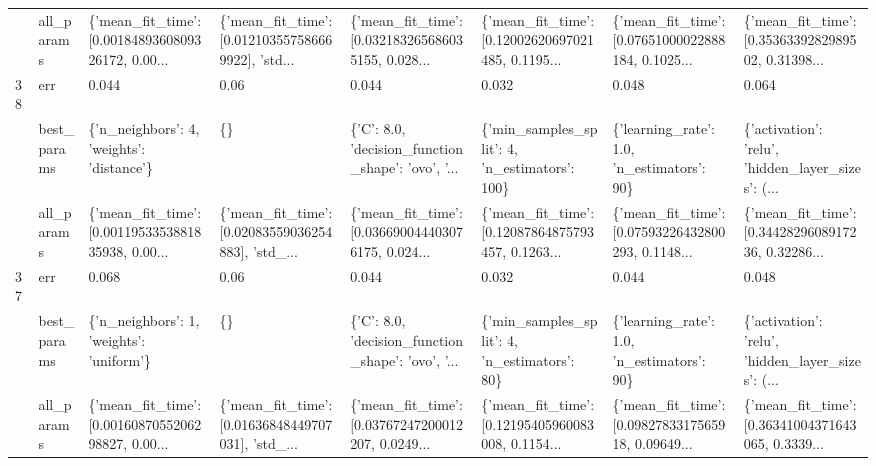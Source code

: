 \begin{tabular}{llllllll}
   & all\_params &  \{'mean\_fit\_time': [0.0018489360809326172, 0.00... &  \{'mean\_fit\_time': [0.012103557586669922], 'std... &  \{'mean\_fit\_time': [0.032183265686035155, 0.028... &  \{'mean\_fit\_time': [0.12002620697021485, 0.1195... &  \{'mean\_fit\_time': [0.07651000022888184, 0.1025... &  \{'mean\_fit\_time': [0.3536339282989502, 0.31398... \\
38 & err &                                              0.044 &                                               0.06 &                                              0.044 &                                              0.032 &                                              0.048 &                                              0.064 \\
   & best\_params &          \{'n\_neighbors': 4, 'weights': 'distance'\} &                                                 \{\} &  \{'C': 8.0, 'decision\_function\_shape': 'ovo', '... &      \{'min\_samples\_split': 4, 'n\_estimators': 100\} &         \{'learning\_rate': 1.0, 'n\_estimators': 90\} &  \{'activation': 'relu', 'hidden\_layer\_sizes': (... \\
   & all\_params &  \{'mean\_fit\_time': [0.0011953353881835938, 0.00... &  \{'mean\_fit\_time': [0.02083559036254883], 'std\_... &  \{'mean\_fit\_time': [0.036690044403076175, 0.024... &  \{'mean\_fit\_time': [0.12087864875793457, 0.1263... &  \{'mean\_fit\_time': [0.07593226432800293, 0.1148... &  \{'mean\_fit\_time': [0.3442829608917236, 0.32286... \\
37 & err &                                              0.068 &                                               0.06 &                                              0.044 &                                              0.032 &                                              0.044 &                                              0.048 \\
   & best\_params &           \{'n\_neighbors': 1, 'weights': 'uniform'\} &                                                 \{\} &  \{'C': 8.0, 'decision\_function\_shape': 'ovo', '... &       \{'min\_samples\_split': 4, 'n\_estimators': 80\} &         \{'learning\_rate': 1.0, 'n\_estimators': 90\} &  \{'activation': 'relu', 'hidden\_layer\_sizes': (... \\
   & all\_params &  \{'mean\_fit\_time': [0.0016087055206298827, 0.00... &  \{'mean\_fit\_time': [0.01636848449707031], 'std\_... &  \{'mean\_fit\_time': [0.03767247200012207, 0.0249... &  \{'mean\_fit\_time': [0.12195405960083008, 0.1154... &  \{'mean\_fit\_time': [0.0982783317565918, 0.09649... &  \{'mean\_fit\_time': [0.36341004371643065, 0.3339... \\

\end{tabular}
